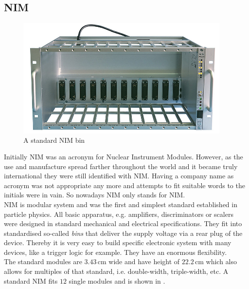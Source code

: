\documentclass[british,11pt,a4paper]{memoir}
\begin{document}
\subsection{NIM}
\begin{figure}[ht]
	\centering
	\includegraphics[width=0.95\textwidth]{nim}
	\caption{A standard NIM bin}
	\label{pnim}
\end{figure}\no
Initially NIM was an acronym for Nuclear Instrument Modules. However, as the use and manufacture spread farther throughout the world and it became truly international they were still identified with NIM. Having a company name as acronym was not appropriate any more and attempts to fit suitable words to the initials were in vain. So nowadays NIM only stands for NIM.\\
NIM is modular system and was the first and simplest standard established in particle physics. All basic apparatus, e.g. amplifiers, discriminators or scalers were designed in standard mechanical and electrical specifications. They fit into standardised so-called \textit{bins} that deliver the supply voltage via a rear plug of the device. Thereby it is very easy to build specific electronic system with many devices, like a trigger logic for example. They have an enormous flexibility.\\
The standard modules are $3.43\,$cm wide and have height of $22.2\,$cm  which also allows for multiples of that standard, i.e. double-width, triple-width, etc. A standard NIM fits $12$ single modules and is shown in .
\end{document}
